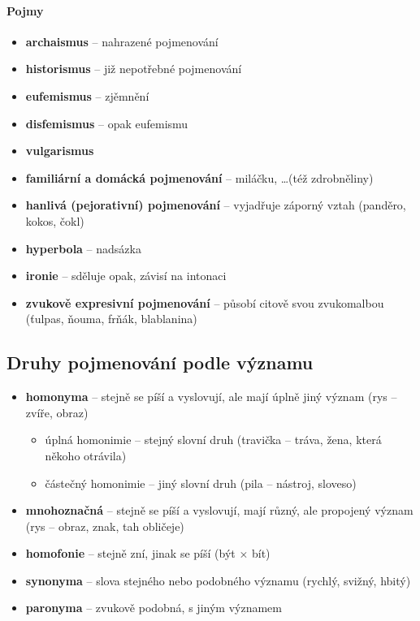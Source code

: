 \paragraph{Pojmy}
\begin{itemize}
\item \textbf{archaismus} -- nahrazené pojmenování
\item \textbf{historismus} -- již nepotřebné pojmenování
\item \textbf{eufemismus} -- zjěmnění
\item \textbf{disfemismus} -- opak eufemismu
\item \textbf{vulgarismus} 
\item \textbf{familiární a domácká pojmenování} -- miláčku, \ldots (též zdrobněliny)
\item \textbf{hanlivá (pejorativní) pojmenování} -- vyjadřuje záporný vztah (panděro, kokos, čokl)
\item \textbf{hyperbola} -- nadsázka
\item \textbf{ironie} -- sděluje opak, závisí na intonaci
\item \textbf{zvukově expresivní pojmenování} -- působí citově svou zvukomalbou (ťulpas, ňouma, frňák, blablanina)
\end{itemize}

\subsection{Druhy pojmenování podle významu}
\begin{itemize}
\item \textbf{homonyma} -- stejně se píší a vyslovují, ale mají úplně jiný význam (rys -- zvíře, obraz)
	\begin{itemize}
	\item úplná homonimie -- stejný slovní druh (travička -- tráva, žena, která někoho otrávila)
	\item částečný homonimie -- jiný slovní druh (pila -- nástroj, sloveso)
	\end{itemize}
\item \textbf{mnohoznačná} -- stejně se píší a vyslovují, mají různý, ale propojený význam (rys -- obraz, znak, tah obličeje)
\item \textbf{homofonie} -- stejně zní, jinak se píší (být $\times$ bít)
\item \textbf{synonyma} -- slova stejného nebo podobného významu (rychlý, svižný, hbitý)
\item \textbf{paronyma} -- zvukově podobná, s jiným významem
\end{itemize}

